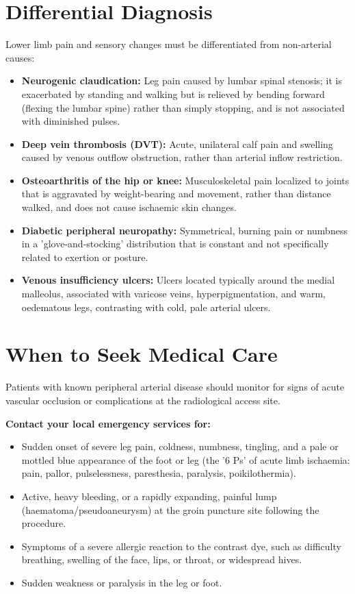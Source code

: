 \section*{Differential Diagnosis}
Lower limb pain and sensory changes must be differentiated from non-arterial causes:

\begin{itemize}
    \item \textbf{Neurogenic claudication:} Leg pain caused by lumbar spinal stenosis; it is exacerbated by standing and walking but is relieved by bending forward (flexing the lumbar spine) rather than simply stopping, and is not associated with diminished pulses.
    \item \textbf{Deep vein thrombosis (DVT):} Acute, unilateral calf pain and swelling caused by venous outflow obstruction, rather than arterial inflow restriction.
    \item \textbf{Osteoarthritis of the hip or knee:} Musculoskeletal pain localized to joints that is aggravated by weight-bearing and movement, rather than distance walked, and does not cause ischaemic skin changes.
    \item \textbf{Diabetic peripheral neuropathy:} Symmetrical, burning pain or numbness in a 'glove-and-stocking' distribution that is constant and not specifically related to exertion or posture.
    \item \textbf{Venous insufficiency ulcers:} Ulcers located typically around the medial malleolus, associated with varicose veins, hyperpigmentation, and warm, oedematous legs, contrasting with cold, pale arterial ulcers.
\end{itemize}

\section*{When to Seek Medical Care}
Patients with known peripheral arterial disease should monitor for signs of acute vascular occlusion or complications at the radiological access site.

\textbf{Contact your local emergency services for:}
\begin{itemize}
    \item Sudden onset of severe leg pain, coldness, numbness, tingling, and a pale or mottled blue appearance of the foot or leg (the '6 Ps' of acute limb ischaemia: pain, pallor, pulselessness, paresthesia, paralysis, poikilothermia).
    \item Active, heavy bleeding, or a rapidly expanding, painful lump (haematoma/pseudoaneurysm) at the groin puncture site following the procedure.
    \item Symptoms of a severe allergic reaction to the contrast dye, such as difficulty breathing, swelling of the face, lips, or throat, or widespread hives.
    \item Sudden weakness or paralysis in the leg or foot.
\end{itemize}


